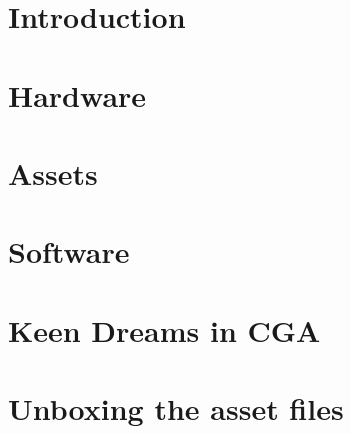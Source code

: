 \documentclass[8pt]{book}
\begin{document}
         

    \renewcommand{\rmdefault}{cmss} 
    \renewcommand{\familydefault}{\sfdefault}
    

    
    
    \cleardoublepage %
  

    \cleardoublepage %

    \setcounter{secnumdepth}{3} %
    
    
    
    
    \tableofcontents
    
    \pagebreak

	\chapter{Introduction}
      
    
  
    \chapter{Hardware}
      
      
    \chapter{Assets}
      
      
    \chapter{Software}
       
       
       
       
       
       
       
    \chapter{Keen Dreams in CGA}
       
       
    \appendix
    \appendixpage

	\chapter{Unboxing the asset files}
   		    
    
\end{document}
